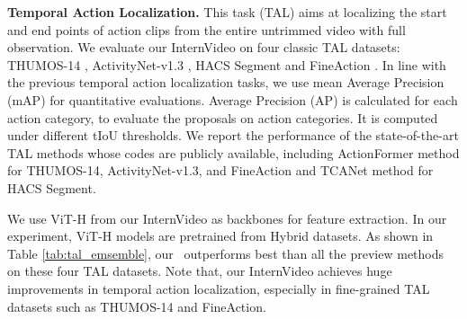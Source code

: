 \textbf{Temporal Action Localization.}
This task (TAL) aims at localizing the start and end points of action clips from the entire untrimmed video with full observation.
We evaluate our InternVideo on four classic TAL datasets: THUMOS-14 \cite{idrees2017thumos}, ActivityNet-v1.3 \cite{caba2015activitynet}, HACS Segment  \cite{zhao2019hacs} and FineAction \cite{liu2022fineaction}.
In line with the previous temporal action localization tasks, we use mean Average Precision (mAP) for quantitative evaluations. Average Precision (AP) is calculated for each action category, to evaluate the proposals on action categories. It is computed under different tIoU thresholds.
We report the performance of the state-of-the-art TAL methods whose codes are publicly available, including ActionFormer \cite{zhang2022actionformer} method for THUMOS-14, ActivityNet-v1.3, and FineAction and TCANet \cite{qing2021temporal} method for HACS Segment.

We use ViT-H from our InternVideo as backbones for feature extraction. 
In our experiment, ViT-H models are pretrained from Hybrid datasets.
As shown in Table \ref{tab:tal_emsemble},
our \model~outperforms best than all the preview methods on these four TAL datasets.
Note that, our InternVideo achieves huge improvements in temporal action localization, especially in fine-grained TAL datasets such as THUMOS-14 and FineAction.



